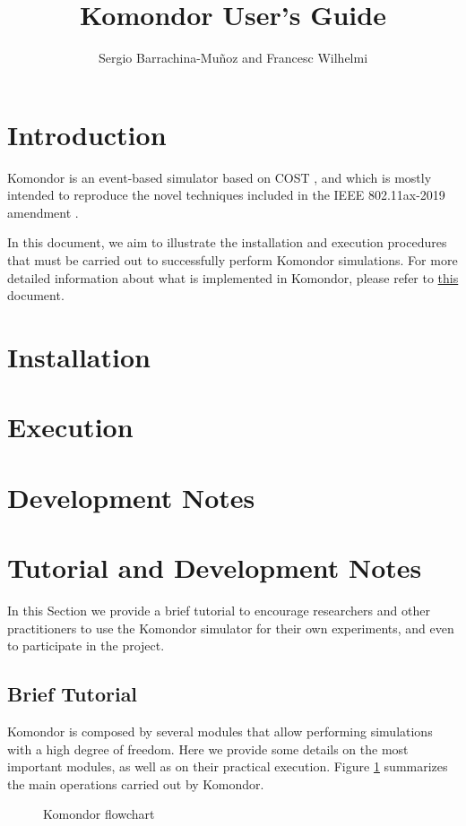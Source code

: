\documentclass[a4paper]{article}
\title{Komondor User's Guide}
\author{Sergio Barrachina-Mu\~noz and Francesc Wilhelmi}
\begin{document}
\maketitle

\tableofcontents

\listoffigures

\listoftables

\section{Introduction}
\label{section:introduction}
	Komondor \cite{barrachina2017komondor} is an event-based simulator based on COST \cite{chen2002reusing}, and which is mostly intended to reproduce the novel techniques included in the IEEE 802.11ax-2019 amendment \cite{tgax2017draft}.
	
	In this document, we aim to illustrate the installation and execution procedures that must be carried out to successfully perform Komondor simulations. For more detailed information about what is implemented in Komondor, please refer to \href{https://github.com/wn-upf/Komondor/blob/master/Documentation/Tutorial/LaTeX\%20files/komondor_technical_report.pdf}{this} document.


\section{Installation}

\section{Execution}

\section{Development Notes}


\section{Tutorial and Development Notes}
\label{section:tutorial_and_development_notes}
	In this Section we provide a brief tutorial to encourage researchers and other practitioners to use the Komondor simulator for their own experiments, and even to participate in the project. 
	\subsection{Brief Tutorial}
	\label{section:brief_tutorial}
		Komondor is composed by several modules that allow performing simulations with a high degree of freedom. Here we provide some details on the most important modules, as well as on their practical execution. Figure \ref{fig:komondor_flowchart} summarizes the main operations carried out by Komondor.
		\begin{figure}[h!]
			\centering
			\caption{Komondor flowchart}
			\label{fig:komondor_flowchart}
		\end{figure}		
		
\end{document}
